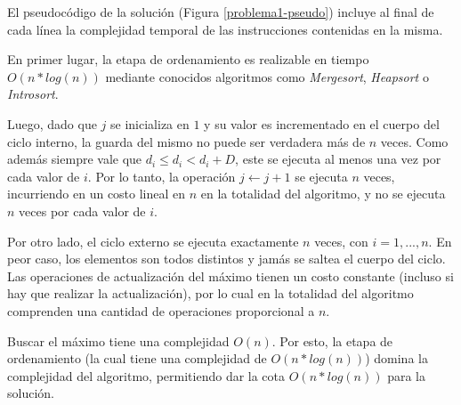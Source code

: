 El pseudocódigo de la solución (Figura \ref{problema1-pseudo}) incluye al final de cada línea la complejidad temporal de las instrucciones contenidas en la misma.

En primer lugar, la etapa de ordenamiento es realizable en tiempo $O(n *log(n))$ mediante conocidos algoritmos como \emph{Mergesort}, \emph{Heapsort} o \emph{Introsort}.

Luego, dado que $j$ se inicializa en $1$ y su valor es incrementado en el cuerpo del ciclo interno, la guarda del mismo no puede ser verdadera más de $n$ veces. Como además siempre vale que $d_i \leq d_i < d_i + D$, este se ejecuta al menos una vez por cada valor de $i$. Por lo tanto, la operación $j \leftarrow j + 1$ se ejecuta $n$ veces, incurriendo en un costo lineal en $n$ en la totalidad del algoritmo, y no se ejecuta $n$ veces por cada valor de $i$.

Por otro lado, el ciclo externo se ejecuta exactamente $n$ veces, con $i = 1, ..., n$. En peor caso, los elementos son todos distintos y jamás se saltea el cuerpo del ciclo. Las operaciones de actualización del máximo tienen un costo constante (incluso si hay que realizar la actualización), por lo cual en la totalidad del algoritmo comprenden una cantidad de operaciones proporcional a $n$.

Buscar el máximo tiene una complejidad $O(n)$. Por esto, la etapa de ordenamiento (la cual tiene una complejidad de $O(n*log(n))$) domina la complejidad del algoritmo, permitiendo dar la cota $O(n*log(n))$ para la solución.